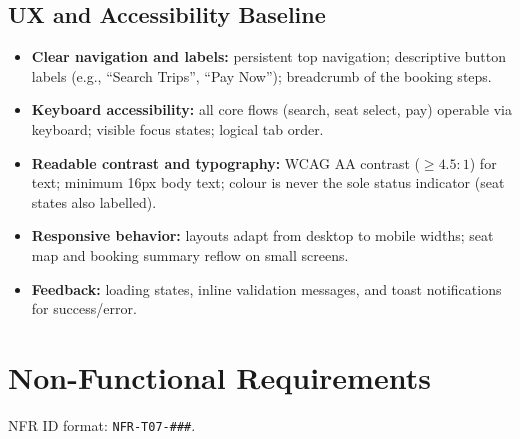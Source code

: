 \documentclass[11pt,a4paper]{article}
\begin{document}
\subsection{UX and Accessibility Baseline}
\begin{itemize}[leftmargin=1.4em]
  \item \textbf{Clear navigation and labels:} persistent top navigation; descriptive button labels
        (e.g., ``Search Trips'', ``Pay Now''); breadcrumb of the booking steps.
  \item \textbf{Keyboard accessibility:} all core flows (search, seat select, pay) operable via
        keyboard; visible focus states; logical tab order.
  \item \textbf{Readable contrast and typography:} WCAG AA contrast ($\geq 4.5{:}1$) for text;
        minimum 16px body text; colour is never the sole status indicator (seat states also
        labelled).
  \item \textbf{Responsive behavior:} layouts adapt from desktop to mobile widths; seat map and
        booking summary reflow on small screens.
  \item \textbf{Feedback:} loading states, inline validation messages, and toast notifications for
        success/error.
\end{itemize}

\section{Non-Functional Requirements}

NFR ID format: \texttt{NFR-T07-\#\#\#}.
\end{document}
